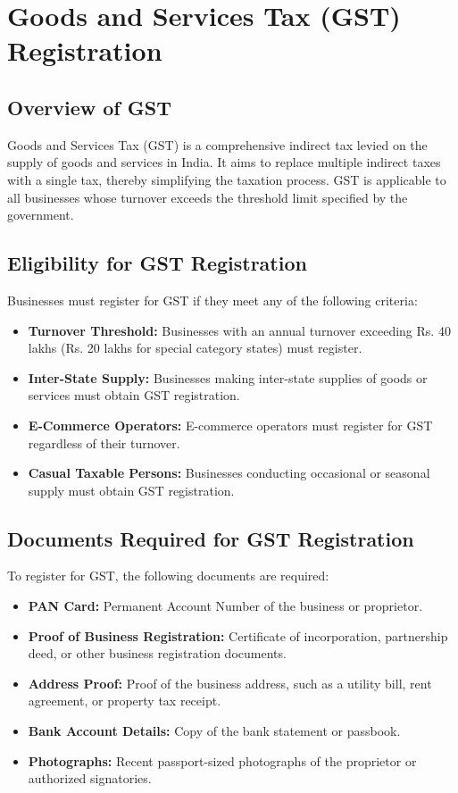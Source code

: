 \documentclass{article}
\begin{document}
\chapter{Goods and Services Tax (GST) Registration}
\section{Overview of GST}
Goods and Services Tax (GST) is a comprehensive indirect tax levied on the supply of goods and services in India. It aims to replace multiple indirect taxes with a single tax, thereby simplifying the taxation process. GST is applicable to all businesses whose turnover exceeds the threshold limit specified by the government.

\section{Eligibility for GST Registration}
Businesses must register for GST if they meet any of the following criteria:
\begin{itemize}
    \item \textbf{Turnover Threshold:} Businesses with an annual turnover exceeding Rs. 40 lakhs (Rs. 20 lakhs for special category states) must register.
    \item \textbf{Inter-State Supply:} Businesses making inter-state supplies of goods or services must obtain GST registration.
    \item \textbf{E-Commerce Operators:} E-commerce operators must register for GST regardless of their turnover.
    \item \textbf{Casual Taxable Persons:} Businesses conducting occasional or seasonal supply must obtain GST registration.
\end{itemize}

\section{Documents Required for GST Registration}
To register for GST, the following documents are required:
\begin{itemize}
    \item \textbf{PAN Card:} Permanent Account Number of the business or proprietor.
    \item \textbf{Proof of Business Registration:} Certificate of incorporation, partnership deed, or other business registration documents.
    \item \textbf{Address Proof:} Proof of the business address, such as a utility bill, rent agreement, or property tax receipt.
    \item \textbf{Bank Account Details:} Copy of the bank statement or passbook.
    \item \textbf{Photographs:} Recent passport-sized photographs of the proprietor or authorized signatories.
\end{itemize}
\end{document}
